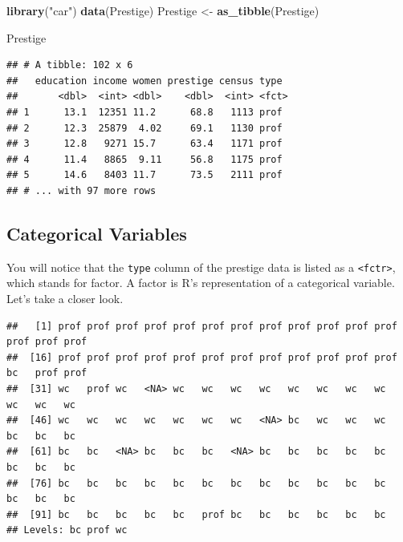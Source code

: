 \documentclass[
  12pt,
  oneside,openany]{book}
\newenvironment{Shaded}{\begin{snugshade}}{\end{snugshade}}
\newcommand{\KeywordTok}[1]{\textcolor[rgb]{0.13,0.29,0.53}{\textbf{#1}}}
\newcommand{\NormalTok}[1]{#1}
\newcommand{\OperatorTok}[1]{\textcolor[rgb]{0.81,0.36,0.00}{\textbf{#1}}}
\newcommand{\StringTok}[1]{\textcolor[rgb]{0.31,0.60,0.02}{#1}}
\begin{document}
\begin{Shaded}
\begin{Highlighting}[]
\KeywordTok{library}\NormalTok{(}\StringTok{"car"}\NormalTok{)}
\KeywordTok{data}\NormalTok{(Prestige)}
\NormalTok{Prestige \textless{}{-}}\StringTok{ }\KeywordTok{as\_tibble}\NormalTok{(Prestige)}

\NormalTok{Prestige}
\end{Highlighting}
\end{Shaded}

\begin{verbatim}
## # A tibble: 102 x 6
##   education income women prestige census type 
##       <dbl>  <int> <dbl>    <dbl>  <int> <fct>
## 1      13.1  12351 11.2      68.8   1113 prof 
## 2      12.3  25879  4.02     69.1   1130 prof 
## 3      12.8   9271 15.7      63.4   1171 prof 
## 4      11.4   8865  9.11     56.8   1175 prof 
## 5      14.6   8403 11.7      73.5   2111 prof 
## # ... with 97 more rows
\end{verbatim}

\hypertarget{categorical-variables-1}{%
\subsection{Categorical Variables}\label{categorical-variables-1}}

You will notice that the \texttt{type} column of the prestige data is listed as a \texttt{\textless{}fctr\textgreater{}}, which stands for factor. A factor is R's representation of a categorical variable. Let's take a closer look.

\begin{Shaded}
\end{Shaded}

\begin{verbatim}
##   [1] prof prof prof prof prof prof prof prof prof prof prof prof prof prof prof
##  [16] prof prof prof prof prof prof prof prof prof prof prof prof bc   prof prof
##  [31] wc   prof wc   <NA> wc   wc   wc   wc   wc   wc   wc   wc   wc   wc   wc  
##  [46] wc   wc   wc   wc   wc   wc   wc   <NA> bc   wc   wc   wc   bc   bc   bc  
##  [61] bc   bc   <NA> bc   bc   bc   <NA> bc   bc   bc   bc   bc   bc   bc   bc  
##  [76] bc   bc   bc   bc   bc   bc   bc   bc   bc   bc   bc   bc   bc   bc   bc  
##  [91] bc   bc   bc   bc   bc   prof bc   bc   bc   bc   bc   bc  
## Levels: bc prof wc
\end{verbatim}
\end{document}
